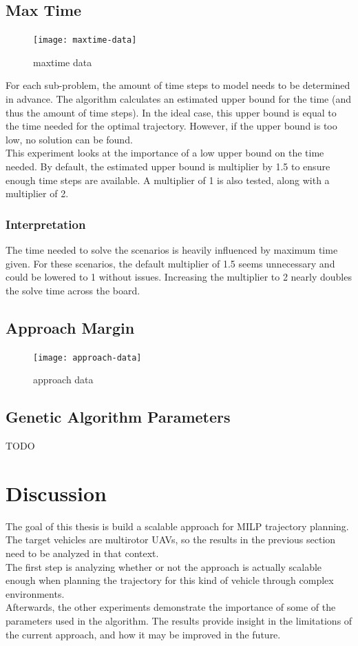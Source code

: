 \clearpage
\subsection{Max Time}
\label{subsec:maxtime}
\begin{figure}[]
	\centering
	\texttt{[image: maxtime-data]}
	\caption{maxtime data}
	\label{fig:maxtime-data}
\end{figure}
For each sub-problem, the amount of time steps to model needs to be determined in advance. The algorithm calculates an estimated upper bound for the time (and thus the amount of time steps). In the ideal case, this upper bound is equal to the time needed for the optimal trajectory. However, if the upper bound is too low, no solution can be found.\\
This experiment looks at the importance of a low upper bound on the time needed. By default, the estimated upper bound is multiplier by 1.5 to ensure enough time steps are available. A multiplier of 1 is also tested, along with a multiplier of 2. 

\subsubsection{Interpretation}
The time needed to solve the scenarios is heavily influenced by maximum time given. For these scenarios, the default multiplier of 1.5 seems unnecessary and could be lowered to 1 without issues. Increasing the multiplier to 2 nearly doubles the solve time across the board.


\clearpage
\subsection{Approach Margin}
\label{subsec:approach-margin}
\begin{figure}[]
	\centering
	\texttt{[image: approach-data]}
	\caption{approach data}
	\label{fig:approach-data}
\end{figure}

\clearpage
\subsection{Genetic Algorithm Parameters}
\label{subsec:ga-params}
TODO



\newpage


\section{Discussion}
The goal of this thesis is build a scalable approach for MILP trajectory planning. The target vehicles are multirotor UAVs, so the results in the previous section need to be analyzed in that context. \\
The first step is analyzing whether or not the approach is actually scalable enough when planning the trajectory for this kind of vehicle through complex environments.\\
Afterwards, the other experiments demonstrate the importance of some of the parameters used in the algorithm. The results provide insight in the limitations of the current approach, and how it may be improved in the future.

